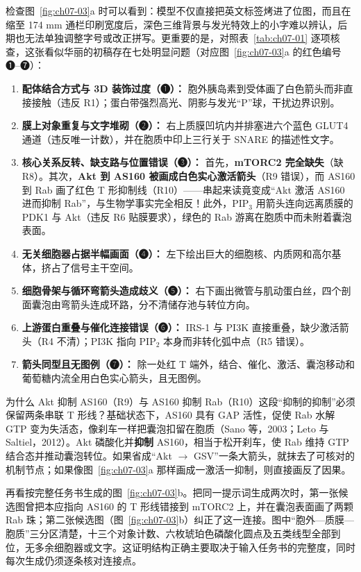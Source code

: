检查图~\ref{fig:ch07-03}a 时可以看到：模型不仅直接把英文标签烤进了位图，而且在缩至 174 mm 通栏印刷宽度后，深色三维背景与发光特效上的小字难以辨认，后期也无法单独调整字号或改正拼写。更重要的是，对照表~\ref{tab:ch07-01} 逐项核查，这张看似华丽的初稿存在七处明显问题（对应图~\ref{fig:ch07-03}a 的红色编号 ❶–❼）：
\begin{enumerate}
\item \textbf{配体结合方式与 3D 装饰过度（❶）：} 胞外胰岛素到受体画了白色箭头而非直接接触（违反 R1）；蛋白带强烈高光、阴影与发光“P”球，干扰边界识别。
\item \textbf{膜上对象重复与文字堆砌（❷）：} 右上质膜凹坑内并排塞进六个蓝色 GLUT4 通道（违反唯一计数），并在胞质中印上三行关于 SNARE 的描述性文字。
\item \textbf{核心关系反转、缺支路与位置错误（❸）：} 首先，\textbf{mTORC2 完全缺失}（缺 R8）。其次，\textbf{Akt 到 AS160 被画成白色实心激活箭头}（R9 错误），而 AS160 到 Rab 画了红色 T 形抑制线（R10）——串起来读竟变成“Akt 激活 AS160 进而抑制 Rab”，与生物学事实完全相反！此外，$\text{PIP}_3$ 用箭头连向远离质膜的 PDK1 与 Akt（违反 R6 贴膜要求），绿色的 Rab 游离在胞质中而未附着囊泡表面。
\item \textbf{无关细胞器占据半幅画面（❹）：} 左下绘出巨大的细胞核、内质网和高尔基体，挤占了信号主干空间。
\item \textbf{细胞骨架与循环弯箭头造成歧义（❺）：} 右下画出微管与肌动蛋白丝，四个剖面囊泡由弯箭头连成环路，分不清储存池与转位方向。
\item \textbf{上游蛋白重叠与催化连接错误（❻）：} IRS-1 与 PI3K 直接重叠，缺少激活箭头（R4 不清）；PI3K 指向 $\text{PIP}_2$ 本身而非转化弧中点（R5 错误）。
\item \textbf{箭头同型且无图例（❼）：} 除一处红 T 端外，结合、催化、激活、囊泡移动和葡萄糖内流全用白色实心箭头，且无图例。
\end{enumerate}

为什么 Akt 抑制 AS160（R9）与 AS160 抑制 Rab（R10）这段“抑制的抑制”必须保留两条串联 T 形线？基础状态下，AS160 具有 GAP 活性，促使 Rab 水解 GTP 变为失活态，像刹车一样把囊泡扣留在胞质（Sano 等，2003；Leto 与 Saltiel，2012）。Akt 磷酸化并\textbf{抑制} AS160，相当于松开刹车，使 Rab 维持 GTP 结合态并推动囊泡转位。如果省成“Akt $\rightarrow$ GSV”一条大箭头，就抹去了可核对的机制节点；如果像图~\ref{fig:ch07-03}a 那样画成一激活一抑制，则直接画反了因果。

再看按完整任务书生成的图~\ref{fig:ch07-03}b。把同一提示词生成两次时，第一张候选图曾把本应指向 AS160 的 T 形线错接到 mTORC2 上，并在囊泡表面画了两颗 Rab 珠；第二张候选图（图~\ref{fig:ch07-03}b）纠正了这一连接。图中“胞外—质膜—胞质”三分区清楚，十三个对象计数、六枚琥珀色磷酸化圆点及五类线型全部到位，无多余细胞器或文字。这证明结构正确主要取决于输入任务书的完整度，同时每次生成仍须逐条核对连接点。


